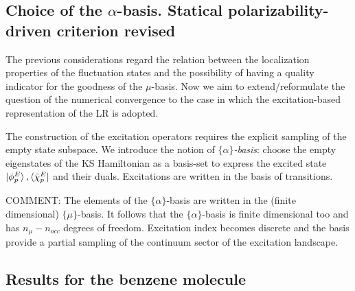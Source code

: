 \documentclass[reprint,aps,prb]{revtex4-1}
\begin{document}
\subsection{Choice of the $\alpha$-basis. Statical polarizability-driven criterion revised}

The previous considerations regard the relation between the localization properties of the fluctuation states and the possibility of having a quality indicator for the goodness of the $\mu$-basis. 
Now we aim to extend/reformulate the question of the numerical convergence to the case in which the excitation-based representation of the LR is adopted.

The construction of the excitation operators requires the explicit sampling of the empty state subspace. We introduce the notion of \emph{$\{\alpha\}$-basis}: choose the empty eigenstates of the KS 
Hamiltonian as a basis-set to express the excited state $\ket{\phi^E_p},\bra{\tilde\chi^E_p}$ and their duals. Excitations are written in the basis of transitions.  

COMMENT: The elements of the $\{\alpha\}$-basis are written in the (finite dimensional) $\{\mu\}$-basis. It follows that the $\{\alpha\}$-basis is finite dimensional too and has $n_\mu-n_{occ}$ degrees
of freedom. Excitation index becomes discrete and the basis provide a partial sampling of the continuum sector of the excitation landscape.    




\subsection{Results for the benzene molecule}
\end{document}
